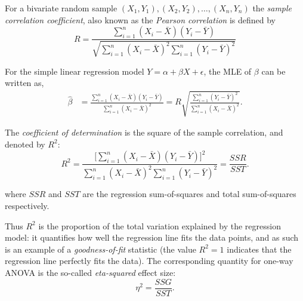 For a bivariate random sample $(X_1,Y_1),(X_2,Y_2),\ldots,(X_n,Y_n)$ the \emph{sample correlation coefficient}, also known as the \emph{Pearson correlation} is defined by
\[
R = \frac{\sum_{i=1}^n(X_i-\bar{X})(Y_i - \bar{Y})}{\sqrt{\sum_{i=1}^n(X_i-\bar{X})^2\sum_{i=1}^n(Y_i-\bar{Y})^2}} 
\]

For the simple linear regression model $Y=\alpha+\beta X + \epsilon$, the MLE of $\beta$ can be written as,
\begin{align*}
\hat{\beta}
	& = \frac{\sum_{i=1}^n (X_i-\bar{X})(Y_i-\bar{Y})}{\sum_{i=1}^n (X_i-\bar{X})^2} 
	= R\sqrt{\frac{\sum_{i=1}^n(Y_i-\bar{Y})^2}{\sum_{i=1}^n(X_i-\bar{X})^2}}.
\end{align*}

The \emph{coefficient of determination} is the square of the sample correlation, and denoted by $R^2$:
\[
R^2 
	= \frac{\big[\sum_{i=1}^n(X_i-\bar{X})(Y_i - \bar{Y})\big]^2}{\sum_{i=1}^n(X_i-\bar{X})^2\sum_{i=1}^n(Y_i-\bar{Y})^2}
	= \frac{SSR}{SST}.
\]

where $SSR$ and $SST$ are the regression sum-of-squares and total sum-of-squares respectively. 

\bigskip
Thus $R^2$ is the proportion of the total variation explained by the regression model: it quantifies how well the regression line fits the data points, and as such is an example of a \emph{goodness-of-fit} statistic (the value $R^2=1$ indicates that the regression line perfectly fits the data). The corresponding quantity for one-way ANOVA is the so-called \emph{eta-squared} effect size:
\[
\eta^2 = \frac{SSG}{SST}.
\]

